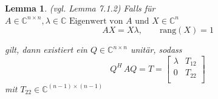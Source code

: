 \documentclass[a4paper,12pt]{report}
\newcommand{\C}{\mathbb C}
\newcommand{\rang}{\text{rang}}
\newcommand{\1}{\mathds{1}}
\theoremstyle{plain} %
\newtheorem{lemma}[theorem]{Lemma}  %
\theoremstyle{definition} %
\theoremstyle{remark}
\begin{document}
            \begin{lemma}(vgl. Lemma 7.1.2\cite[S. 312]{matrixGolub})
                  \label{lemma: Hilfe Schur}
                  Falls für $A\in\C^{n\times n}, \lambda\in \C \text{ Eigenwert von }A\text{ und }X\in \C^{n}$
                  \begin{equation}
                        \label{eqn: Hilfslemma Schur_Bed}
                        AX = X\lambda,\qquad \rang(X)=1
                  \end{equation}
                  
                  gilt, dann existiert ein $Q\in \C^{n\times n}$ unitär, sodass
                  $$Q^H\,AQ = T =  \begin{bmatrix}
                        \lambda & T_{12} \\
                        0 & T_{22} \\
                        \end{bmatrix}$$
                  mit $T_{22}\in \C^{(n-1)\times(n-1)}$
            \end{lemma}
\end{document}
